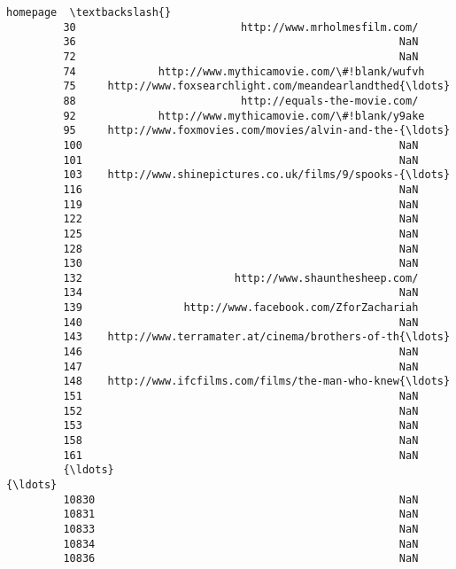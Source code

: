 \documentclass[11pt]{article}
\begin{document}
\begin{Verbatim}[commandchars=\\\{\}]
                                                         homepage  \textbackslash{}
         30                          http://www.mrholmesfilm.com/   
         36                                                   NaN   
         72                                                   NaN   
         74             http://www.mythicamovie.com/\#!blank/wufvh   
         75     http://www.foxsearchlight.com/meandearlandthed{\ldots}   
         88                          http://equals-the-movie.com/   
         92             http://www.mythicamovie.com/\#!blank/y9ake   
         95     http://www.foxmovies.com/movies/alvin-and-the-{\ldots}   
         100                                                  NaN   
         101                                                  NaN   
         103    http://www.shinepictures.co.uk/films/9/spooks-{\ldots}   
         116                                                  NaN   
         119                                                  NaN   
         122                                                  NaN   
         125                                                  NaN   
         128                                                  NaN   
         130                                                  NaN   
         132                        http://www.shaunthesheep.com/   
         134                                                  NaN   
         139                http://www.facebook.com/ZforZachariah   
         140                                                  NaN   
         143    http://www.terramater.at/cinema/brothers-of-th{\ldots}   
         146                                                  NaN   
         147                                                  NaN   
         148    http://www.ifcfilms.com/films/the-man-who-knew{\ldots}   
         151                                                  NaN   
         152                                                  NaN   
         153                                                  NaN   
         158                                                  NaN   
         161                                                  NaN   
         {\ldots}                                                  {\ldots}   
         10830                                                NaN   
         10831                                                NaN   
         10833                                                NaN   
         10834                                                NaN   
         10836                                                NaN   

\end{Verbatim}
\end{document}
